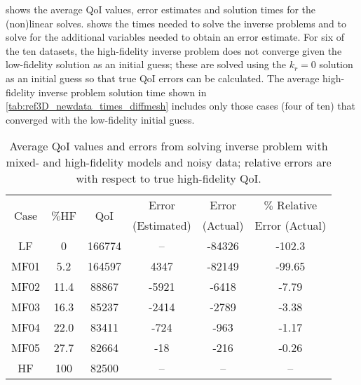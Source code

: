  shows the average QoI values, error estimates and solution times for the (non)linear solves.  shows the times needed to solve the inverse problems and to solve for the additional variables needed to obtain an error estimate. For six of the ten datasets, the high-fidelity inverse problem does not converge given the low-fidelity solution as an initial guess; these are solved using the $k_r=0$ solution as an initial guess so that true QoI errors can be calculated. The average high-fidelity inverse problem solution time shown in \cref{tab:ref3D_newdata_times_diffmesh} includes only those cases (four of ten) that converged with the low-fidelity initial guess.
%
\begin{table}
\caption{Average QoI values and errors from solving inverse problem with mixed- and high-fidelity models and noisy data; relative errors are with respect to true high-fidelity QoI.}
\label{tab:ref3D_newdata_QoI_diffmesh}
\centering
\begin{tabular}{|c|c|c|c|c|c|}
\hline
\multirow{2}{*}{Case} & \multirow{2}{*}{$\%$HF} & \multirow{2}{*}{QoI} & Error & Error & $\%$ Relative  \\
& & & (Estimated) & (Actual) & Error (Actual) \\ \hline
LF   & 0    & 166774 & --    & -84326 & -102.3 \\
MF01 & 5.2  & 164597 & 4347  & -82149 & -99.65  \\
MF02 & 11.4 & 88867  & -5921 & -6418  & -7.79  \\
MF03 & 16.3 & 85237  & -2414 & -2789  & -3.38  \\
MF04 & 22.0 & 83411  & -724  & -963   & -1.17  \\
MF05 & 27.7 & 82664  & -18   & -216   & -0.26 \\
HF   & 100  & 82500  & --    & --     & --  \\ \hline
\end{tabular}
\end{table}

